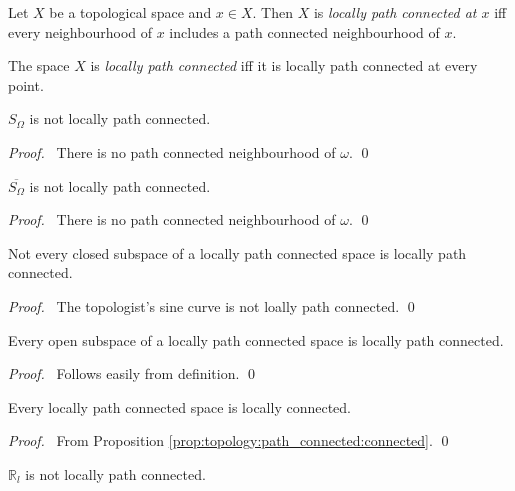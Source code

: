 \begin{df}
  Let $X$ be a topological space and $x \in X$. Then $X$ is \emph{locally
    path connected at $x$} iff every neighbourhood of $x$ includes a path
  connected neighbourhood of $x$.

  The space $X$ is \emph{locally path connected} iff it is locally path
  connected
  at every point.
\end{df}

 \begin{prop}
$S_\Omega$ is not locally path connected.
\end{prop}

\begin{proof}
\pf\ There is no path connected neighbourhood of $\omega$. \qed
\end{proof}

\begin{prop}
 $\overline{S_\Omega}$ is not locally path connected.
\end{prop}

\begin{proof}
\pf\ There is no path connected neighbourhood of $\omega$. \qed
\end{proof}

\begin{prop}
 Not every closed subspace of a locally path connected space is locally path connected.
\end{prop}

\begin{proof}
 \pf\ The topologist's sine curve is not loally path connected. \qed
\end{proof}

\begin{prop}
 Every open subspace of a locally path connected space is locally path connected.
\end{prop}

\begin{proof}
 \pf\ Follows easily from definition. \qed
\end{proof}

\begin{prop}
Every locally path connected space is locally connected.
\end{prop}

\begin{proof}
\pf\ From Proposition \ref{prop:topology:path_connected:connected}. \qed
\end{proof}

\begin{cor}
 $\mathbb{R}_l$ is not locally path connected.
\end{cor}

